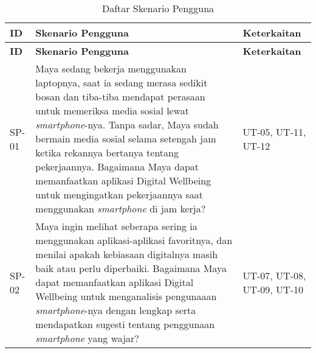 
\RaggedLeft
\begin{small}
\begin{longtable}[c]{|W{c}{0.07\textwidth}|>{\ccnormspacing}m{0.65\textwidth}|>{\ccnormspacingcenter}m{0.19\textwidth}|}
  \caption{Daftar Skenario Pengguna}
  \label{tab:daftar_skenario} \\
  \hline {}
  \textbf{ID} & \centering\textbf{Skenario Pengguna} & \textbf{Keterkaitan} \\ \hline \endfirsthead
  \hline {}
  \textbf{ID} & \centering\textbf{Skenario Pengguna} & \textbf{Keterkaitan} \\ \hline \endhead

  \hline \endfoot
  
  SP-01 & Maya sedang bekerja menggunakan laptopnya, saat ia sedang merasa sedikit bosan dan tiba-tiba mendapat perasaan untuk memeriksa media sosial lewat \textit{smartphone}-nya. Tanpa sadar, Maya sudah bermain media sosial selama setengah jam ketika rekannya bertanya tentang pekerjaannya. Bagaimana Maya dapat memanfaatkan aplikasi Digital Wellbeing untuk mengingatkan pekerjaannya saat menggunakan \textit{smartphone} di jam kerja? & UT-05, UT-11, UT-12 \\ \hline
  
  SP-02 & Maya ingin melihat seberapa sering ia menggunakan aplikasi-aplikasi favoritnya, dan menilai apakah kebiasaan digitalnya masih baik atau perlu diperbaiki. Bagaimana Maya dapat memanfaatkan aplikasi Digital Wellbeing untuk menganalisis pengunaaan \textit{smartphone}-nya dengan lengkap serta mendapatkan sugesti tentang penggunaan \textit{smartphone} yang wajar? & UT-07, UT-08, UT-09, UT-10 \\ \hline
  

\end{longtable}
\end{small}
